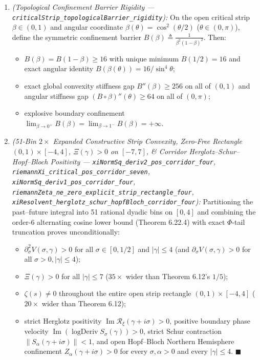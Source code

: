 \documentclass[
  11pt,
]{article}
\providecommand{\tightlist}{%
  \setlength{\itemsep}{0pt}\setlength{\parskip}{0pt}}
\begin{document}
\begin{enumerate}
\def\labelenumi{\arabic{enumi}.}
\tightlist
\item
  \emph{(Topological Confinement Barrier Rigidity ---
  \texttt{criticalStrip\_topologicalBarrier\_rigidity}):} On the open
  critical strip \(\beta \in (0, 1)\) and angular coordinate
  \(\beta(\theta) = \cos^2(\theta/2)\) (\(\theta \in (0, \pi)\)), define
  the symmetric confinement barrier
  \(B(\beta) \triangleq \frac{1}{\beta^2(1-\beta)^2}\). Then:

  \begin{itemize}
  \tightlist
  \item
    \(B(\beta) = B(1 - \beta) \ge 16\) with unique minimum
    \(B(1/2) = 16\) and exact angular identity
    \(B(\beta(\theta)) = 16/\sin^4\theta\);
  \item
    exact global convexity stiffness gap \(B''(\beta) \ge 256\) on all
    of \((0, 1)\) and angular stiffness gap
    \((B \circ \beta)''(\theta) \ge 64\) on all of \((0, \pi)\);
  \item
    explosive boundary confinement
    \(\lim_{\beta \to 0^+} B(\beta) = \lim_{\beta \to 1^-} B(\beta) = +\infty\).
  \end{itemize}
\item
  \emph{(51-Bin \(2\times\) Expanded Constructive Strip Convexity,
  Zero-Free Rectangle \((0, 1) \times [-4, 4]\), \(\Xi(\gamma) > 0\) on
  \([-7, 7]\), \& Corridor Herglotz--Schur--Hopf--Bloch Positivity ---
  \texttt{xiNormSq\_deriv2\_pos\_corridor\_four},
  \texttt{riemannXi\_critical\_pos\_corridor\_seven},
  \texttt{xiNormSq\_deriv1\_pos\_corridor\_four},
  \texttt{riemannZeta\_ne\_zero\_explicit\_strip\_rectangle\_four},
  \texttt{xiResolvent\_herglotz\_schur\_hopfBloch\_corridor\_four}):}
  Partitioning the past--future integral into 51 rational dyadic bins on
  \([0, 4]\) and combining the order-6 alternating cosine lower bound
  (Theorem 6.22.4) with exact \(\Phi\)-tail truncation proves
  unconditionally:

  \begin{itemize}
  \tightlist
  \item
    \(\partial_\sigma^2 V(\sigma, \gamma) > 0\) for all
    \(\sigma \in [0, 1/2]\) and \(|\gamma| \le 4\) (and
    \(\partial_\sigma V(\sigma, \gamma) > 0\) for all
    \(\sigma > 0, |\gamma| \le 4\));
  \item
    \(\Xi(\gamma) > 0\) for all \(|\gamma| \le 7\) (\(35\times\) wider
    than Theorem 6.12's \(1/5\));
  \item
    \(\zeta(s) \neq 0\) throughout the entire open strip rectangle
    \((0, 1) \times [-4, 4]\) (\(20\times\) wider than Theorem 6.12);
  \item
    strict Herglotz positivity
    \(\operatorname{Im}\mathcal{R}_\xi(\gamma + i\sigma) > 0\), positive
    boundary phase velocity
    \(\operatorname{Im}(\operatorname{logDeriv} S_\sigma(\gamma)) > 0\),
    strict Schur contraction \(\|S_\alpha(\gamma + i\sigma)\| < 1\), and
    open Hopf--Bloch Northern Hemisphere confinement
    \(Z_\alpha(\gamma + i\sigma) > 0\) for every \(\sigma, \alpha > 0\)
    and every \(|\gamma| \le 4\). \(\blacksquare\)
  \end{itemize}
\end{enumerate}
\end{document}
